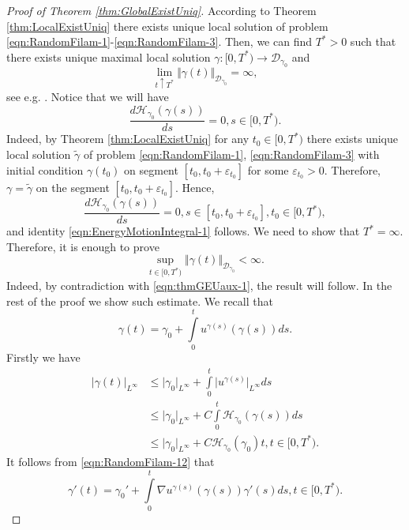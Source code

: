 \documentclass[11pt,a4paper,leqno]{amsart}%
\theoremstyle{plain}
\theoremstyle{remark}
\theoremstyle{plain}
\numberwithin{equation}{section}
\newcommand{\eps}{\varepsilon}
\def\liml{\lim\limits}
\def\supl{\sup\limits}
\def\intl{\int\limits}
\def\supl{\mathop{\sup}\limits}
\begin{document}
\begin{proof}[Proof of Theorem \ref{thm:GlobalExistUniq}]
According to Theorem \ref{thm:LocalExistUniq} there exists unique
local solution of problem
\eqref{eqn:RandomFilam-1}-\eqref{eqn:RandomFilam-3}. Then, we can
find $T^*>0$ such that there exists unique maximal local solution
$\gamma:[0,T^*)\to \mathcal{D}_{\gamma_0}$ and
\begin{equation}
\liml_{t\uparrow
T^*}\Vert \gamma(t)\Vert_{\mathcal{D}_{\gamma_0}}=\infty,\label{eqn:thmGEUaux-1}
\end{equation}
see e.g. \cite{[Cartan-1971]}. Notice that we will have
\begin{equation}
\frac{d\mathcal{H}_{\gamma_0}(\gamma(s))}{ds}=0,s\in[0,T^*).\label{eqn:EnergyMotionIntegral-1}
\end{equation}
Indeed, by Theorem \ref{thm:LocalExistUniq} for any $t_0\in
[0,T^*)$ there exists unique local solution $\tilde{\gamma}$ of
problem \eqref{eqn:RandomFilam-1}, \eqref{eqn:RandomFilam-3} with
initial condition $\gamma(t_0)$ on segment $[t_0,t_0+\eps_{t_0}]$
for some $\eps_{t_0}>0$. Therefore, $\gamma=\tilde{\gamma}$ on the
segment $[t_0,t_0+\eps_{t_0}]$. Hence,
$$
\frac{d\mathcal{H}_{\gamma_0}(\gamma(s))}{ds}=0,s\in[t_0,t_0+\eps_{t_0}],t_0\in[0,T^*),
$$
and identity \eqref{eqn:EnergyMotionIntegral-1} follows. We need
to show that $T^*=\infty$. Therefore, it is enough to prove
$$
\supl_{t\in[0,T^*)}\Vert \gamma(t)\Vert_{\mathcal{D}_{\gamma_0}}<\infty.
$$
Indeed, by contradiction with \eqref{eqn:thmGEUaux-1}, the result
will follow. In the rest of the proof we show such estimate. We
recall that
\begin{equation}
\gamma(t)=\gamma_0+\intl_0^tu^{\gamma(s)}(\gamma(s))ds.\label{eqn:RandomFilam-12}
\end{equation}
Firstly we have
\begin{align}
\vert \gamma(t)\vert_{L^{\infty}}&\leq\vert \gamma_0\vert_{L^{\infty}}+\intl_0^t\vert u^{\gamma(s)}\vert_{L^{\infty}}ds\nonumber\\
&\leq\vert \gamma_0\vert_{L^{\infty}}+C\intl_0^t\mathcal{H}_{\gamma_0}(\gamma(s))ds\nonumber\\
&\leq\vert \gamma_0\vert_{L^{\infty}}+C\mathcal{H}_{\gamma_0}(\gamma_0)t,t\in[0,T^*).\label{eqn:GEUEstim-1}
\end{align}
It follows from \eqref{eqn:RandomFilam-12} that
\begin{equation}
\gamma'(t)=\gamma_0'+\intl_0^t\nabla
u^{\gamma(s)}(\gamma(s))\gamma'(s)ds,t\in[0,T^*).\label{eqn:RandomFilam-12'}
\end{equation}

\end{proof}
\end{document}
